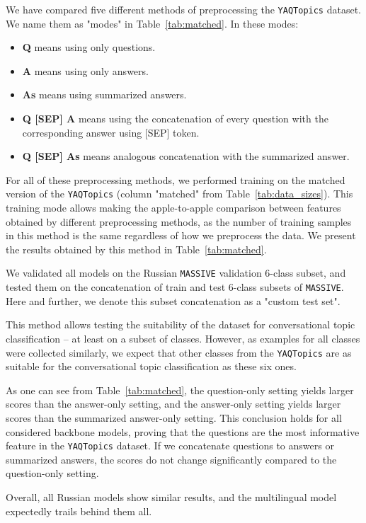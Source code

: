 We have compared five different methods of preprocessing the \texttt{YAQTopics} dataset. We name them as "modes" in Table~\ref{tab:matched}. In these modes:
\begin{itemize}
    \item \textbf{Q} means using only questions.
    \item \textbf{A} means using only answers.
    \item \textbf{As} means using summarized answers.
    \item \textbf{Q [SEP] A} means using the concatenation of every question with the corresponding answer using [SEP] token.
    \item \textbf{Q [SEP] As} means analogous concatenation with the summarized answer. 
\end{itemize}

For all of these preprocessing methods, we performed training on the matched version of the \texttt{YAQTopics} (column "matched" from Table~\ref{tab:data_sizes}). This training mode allows making the apple-to-apple comparison between features obtained by different preprocessing methods, as the number of training samples in this method is the same regardless of how we preprocess the data. We present the results obtained by this method in Table~\ref{tab:matched}.


We validated all models on the Russian \texttt{MASSIVE} validation 6-class subset, and tested them on the concatenation of train and test 6-class subsets of \texttt{MASSIVE}. Here and further, we denote this subset concatenation as a "custom test set".

This method allows testing the suitability of the dataset for conversational topic classification -- at least on a subset of classes. However, as examples for all classes were collected similarly, we expect that other classes from the \texttt{YAQTopics} are as suitable for the conversational topic classification as these six ones. 

As one can see from Table~\ref{tab:matched}, the question-only setting yields larger scores than the answer-only setting, and the answer-only setting yields larger scores than the summarized answer-only setting. This conclusion holds for all considered backbone models, proving that the questions are the most informative feature in the \texttt{YAQTopics} dataset.
If we concatenate questions to answers or summarized answers, the scores do not change significantly compared to the question-only setting.

Overall, all Russian models show similar results, and the multilingual model expectedly trails behind them all.

